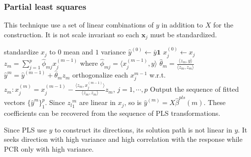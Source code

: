 \documentclass[12pt, letterpaper]{article}
\theoremstyle{definition}
\newcommand{\x}{\mathbf{x}}
\DeclarePairedDelimiter\autobracket{(}{)}
\newcommand{\br}[1]{\autobracket*{#1}}
\begin{document}

\subsubsection{Partial least squares}
This technique use a set of linear combinations of $y$ in addition to $X$ for the construction. It is not scale invariant so each $\x_j$ must be standardized.
\begin{algorithm}
standardize $x_j$ to $0$ mean and $1$ variance\;
$\hat{y}^{(0)}\leftarrow \bar{y}\mathbf{1}$\;
$x_j^{(0)} \leftarrow x_j$ \;
{
    $z_m  = \sum_{j=1}^p \hat{\phi}_{mj} x_j^{(m-1)}$ where $\hat{\phi}_{mj} = \langle x_j^{(m-1)}, y\rangle$ \; 
    $\hat{\theta}_m = \frac{\langle z_m, y\rangle}{\langle z_m, z_m\rangle} $\;
    $\hat{y}^m = \hat{y}^{(m-1)} + \hat{\theta}_m z_m$\;
    orthogonalize each $x_j^{m-1}$ w.r.t. $z_m: x_j^{(m)} = x_j^{(m-1)} - \frac{\langle z_m, x_j^{(m-1)}\rangle}{\langle z_m, z_m\rangle} z_m$, $j=1,\cdots, p$\;
}
Output the sequence of fitted vectors $\{\hat{y}^m\}_1^p$. Since ${z_l}_1^m$ are linear in $x_j$, so is $\hat{y}^{(m)} = X \hat{\beta}^{pls}(m)$. These coefficients can be recovered from the sequence of PLS transformations.
\end{algorithm}

Since PLS use $y$ to construct its directions, its solution path is not linear in $y$. It seeks direction with high variance and high correlation with the response while PCR only with high variance.
\end{document}
